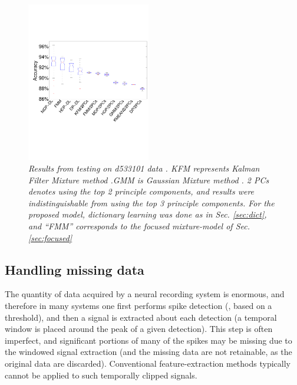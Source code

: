 \documentclass[journal]{IEEEtran}
\begin{document}
\begin{figure}[h!]
  \centering
    \includegraphics[width=0.48\textwidth]{figs_new/Accuracy_hc_1.pdf}
    \caption{\textit{\small{ Results from testing on d533101 data \cite{Henze2000}. KFM represents Kalman Filter
Mixture method \cite{Calabrese2010}.GMM is Gaussian Mixture method \cite{bishop2006}. 2 PCs denotes using the top 2 principle components, and results were indistinguishable from using the top 3 principle components. For the proposed model, dictionary learning was done as in Sec. \ref{sec:dict}, and ``FMM'' corresponds to the focused mixture-model of Sec. \ref{sec:focused}}}}
\label{fig:Accuracy_hc_1}
\end{figure}

\subsection{Handling missing data}

The quantity of data acquired by a neural recording system is enormous, and therefore in many systems one first performs spike detection (, based on a threshold), and then a signal is extracted about each detection (a temporal window is placed around the peak of a given detection). This step is often imperfect, and significant portions of many of the spikes may be missing due to the windowed signal extraction (and the missing data are not retainable, as the original data are discarded). Conventional feature-extraction methods typically cannot be applied to such temporally clipped signals.
\end{document}
